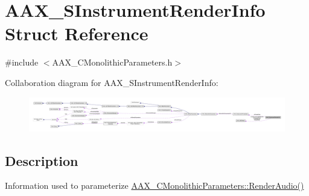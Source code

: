 \hypertarget{a01965}{}\section{A\+A\+X\+\_\+\+S\+Instrument\+Render\+Info Struct Reference}
\label{a01965}


{\ttfamily \#include $<$A\+A\+X\+\_\+\+C\+Monolithic\+Parameters.\+h$>$}



Collaboration diagram for A\+A\+X\+\_\+\+S\+Instrument\+Render\+Info\+:
\nopagebreak
\begin{figure}[H]
\begin{center}
\leavevmode
\includegraphics[width=350pt]{a01963}
\end{center}
\end{figure}


\subsection{Description}
Information used to parameterize \mbox{\hyperlink{a01969_a04f2f73d70ea28c17747c68fc3a20fc8}{A\+A\+X\+\_\+\+C\+Monolithic\+Parameters\+::\+Render\+Audio()}} 

